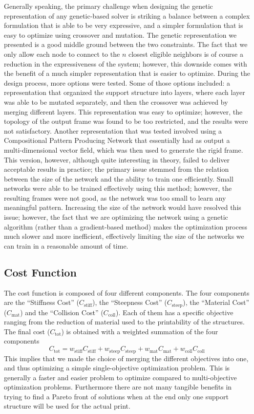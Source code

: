 Generally speaking, the primary challenge when designing the genetic representation
of any genetic-based solver is striking a balance between a complex formulation 
that is able to be very expressive, and a simpler formulation that is easy to optimize
using crossover and mutation.
The genetic representation we presented is a good middle ground between the two 
constraints. The fact that we only allow each node to connect to the $n$ closest eligible
neighbors is of course a reduction in the expressiveness of the system; however,
this downside comes with the benefit of a much simpler representation that is easier to optimize.
During the design process, more options were tested.
Some of those options included:
a representation that organized the support structure into layers, where each layer was 
able to be mutated separately, and then the crossover was achieved by merging different layers.
This representation was easy to optimize; however, the topology of the output frame was found 
to be too restricted, and the results were not satisfactory.
Another representation that was tested involved using a Compositional Pattern Producing Network
that essentially had as output a multi-dimensional vector field, which was then used to generate
the rigid frame. This version, however, although quite interesting in theory, failed to deliver
acceptable results in practice; the primary issue stemmed from the relation
between the size of the network and the ability to train one efficiently.
Small networks were able to be trained effectively using this method; however, the resulting
frames were not good, as the network was too small to learn any meaningful pattern.
Increasing the size of the network would have resolved this issue; however, the fact that we are
optimizing the network using a genetic algorithm (rather than a gradient-based method)
makes the optimization process much slower and more inefficient, effectively limiting the
size of the networks we can train in a reasonable amount of time.


\subsection{Cost Function}
\label{sec:sup_struct_opt_cf}

The cost function is composed of four different components.
The four components are the ``Stiffness Cost'' ($C_\text{stiff}$),
the ``Steepness Cost'' ($C_\text{steep}$), the ``Material Cost'' ($C_\text{mat}$)
and the ``Collision Cost'' ($C_\text{coll}$).
Each of them has a specific objective ranging from the reduction 
of material used to the printability of the structures. The final cost ($C_\text{tot}$)
is obtained with a weighted summation of the four components
$$
C_\text{tot} = w_\text{stiff}C_\text{stiff} + w_\text{steep}C_\text{steep} + w_\text{mat}C_\text{mat} + w_\text{coll}C_\text{coll}
$$
This implies that we made the choice of merging the different objectives into one,
and thus optimizing a simple single-objective optimization problem.
This is generally a faster and easier problem to optimize compared to 
multi-objective optimization problems.
Furthermore there are not many tangible benefits in trying to find a Pareto
front of solutions when at the end only one support structure will be used for the actual print.

